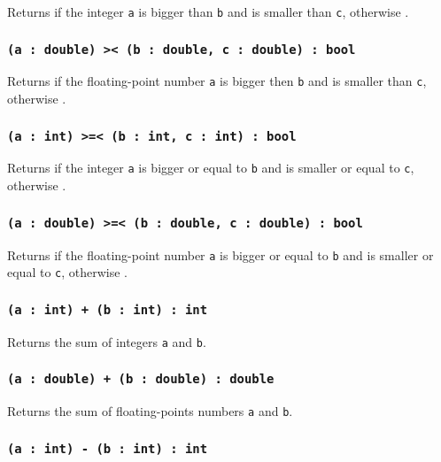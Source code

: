 Returns \true{} if the integer \texttt{a} is bigger than \texttt{b} and is smaller than \texttt{c}, otherwise \false{}.

\subsubsection{\texttt{(a : double) >< (b : double, c : double) : bool}}

Returns \true{} if the floating-point number \texttt{a} is bigger then \texttt{b} and is smaller than \texttt{c}, otherwise \false{}.

\subsubsection{\texttt{(a : int) >=< (b : int, c : int) : bool}}

Returns \true{} if the integer \texttt{a} is bigger or equal to \texttt{b} and is smaller or equal to \texttt{c}, otherwise \false{}.

\subsubsection{\texttt{(a : double) >=< (b : double, c : double) : bool}}

Returns \true{} if the floating-point number \texttt{a} is bigger or equal to \texttt{b} and is smaller or equal to \texttt{c}, otherwise \false{}.

\subsubsection{\texttt{(a : int) + (b : int) : int}}

Returns the sum of integers \texttt{a} and \texttt{b}.

\subsubsection{\texttt{(a : double) + (b : double) : double}}

Returns the sum of floating-points numbers \texttt{a} and \texttt{b}.

\subsubsection{\texttt{(a : int) - (b : int) : int}}

